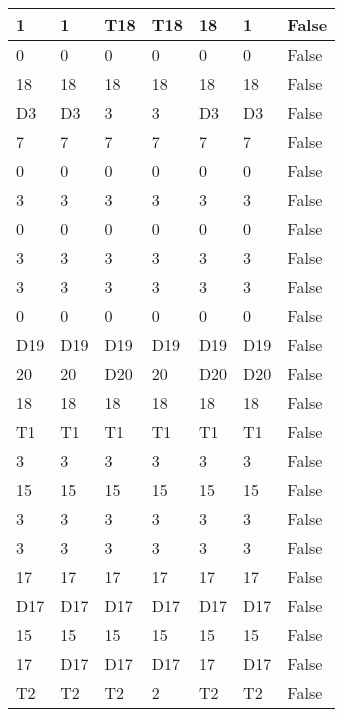 \begin{longtable}[htbp]{| p{} | p{} | p{}| p{}| p{}| p{}| p{}|}
1 & 1 & \multicolumn{1}{l|}{T18} & \multicolumn{1}{l|}{T18} & 18 & 1 & False \\ \hline
0 & 0 & 0 & 0 & 0 & 0 & False \\ \hline
18 & 18 & 18 & 18 & 18 & 18 & False \\ \hline
\multicolumn{1}{|l|}{D3} & \multicolumn{1}{l|}{D3} & 3 & 3 & \multicolumn{1}{l|}{D3} & \multicolumn{1}{l|}{D3} & False \\ \hline
7 & 7 & 7 & 7 & 7 & 7 & False \\ \hline
0 & 0 & 0 & 0 & 0 & 0 & False \\ \hline
3 & 3 & 3 & 3 & 3 & 3 & False \\ \hline
0 & 0 & 0 & 0 & 0 & 0 & False \\ \hline
3 & 3 & 3 & 3 & 3 & 3 & False \\ \hline
3 & 3 & 3 & 3 & 3 & 3 & False \\ \hline
0 & 0 & 0 & 0 & 0 & 0 & False \\ \hline
\multicolumn{1}{|l|}{D19} & \multicolumn{1}{l|}{D19} & \multicolumn{1}{l|}{D19} & \multicolumn{1}{l|}{D19} & \multicolumn{1}{l|}{D19} & \multicolumn{1}{l|}{D19} & False \\ \hline
20 & 20 & \multicolumn{1}{l|}{D20} & 20 & \multicolumn{1}{l|}{D20} & \multicolumn{1}{l|}{D20} & False \\ \hline
18 & 18 & 18 & 18 & 18 & 18 & False \\ \hline
\multicolumn{1}{|l|}{T1} & \multicolumn{1}{l|}{T1} & \multicolumn{1}{l|}{T1} & \multicolumn{1}{l|}{T1} & \multicolumn{1}{l|}{T1} & \multicolumn{1}{l|}{T1} & False \\ \hline
3 & 3 & 3 & 3 & 3 & 3 & False \\ \hline
15 & 15 & 15 & 15 & 15 & 15 & False \\ \hline
3 & 3 & 3 & 3 & 3 & 3 & False \\ \hline
3 & 3 & 3 & 3 & 3 & 3 & False \\ \hline
17 & 17 & 17 & 17 & 17 & 17 & False \\ \hline
\multicolumn{1}{|l|}{D17} & \multicolumn{1}{l|}{D17} & \multicolumn{1}{l|}{D17} & \multicolumn{1}{l|}{D17} & \multicolumn{1}{l|}{D17} & \multicolumn{1}{l|}{D17} & False \\ \hline
15 & 15 & 15 & 15 & 15 & 15 & False \\ \hline
17 & \multicolumn{1}{l|}{D17} & \multicolumn{1}{l|}{D17} & \multicolumn{1}{l|}{D17} & 17 & \multicolumn{1}{l|}{D17} & False \\ \hline
\multicolumn{1}{|l|}{T2} & \multicolumn{1}{l|}{T2} & \multicolumn{1}{l|}{T2} & 2 & \multicolumn{1}{l|}{T2} & \multicolumn{1}{l|}{T2} & False \\ \hline

\end{longtable}
